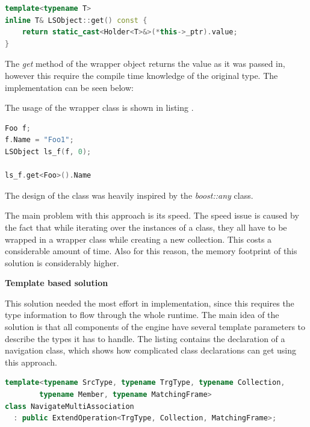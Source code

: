 \begin{lstlisting}[frame=single,float=!ht,language=C++, caption=Retrieving
correctly typed object]
template<typename T>
inline T& LSObject::get() const {
    return static_cast<Holder<T>&>(*this->_ptr).value;
}
\end{lstlisting}


The \emph{get} method of the wrapper object returns the value as it was passed
in, however this require the compile time knowledge of the original type. The
implementation can be seen below:

The usage of the wrapper class is shown in listing .

\begin{lstlisting}[frame=single,float=!ht,language=C++,
label=listing:wrapper_usage, caption=Wrapper object usage]
Foo f;
f.Name = "Foo1";
LSObject ls_f(f, 0);

ls_f.get<Foo>().Name
\end{lstlisting}

The design of the class was heavily inspired by the
\emph{boost::any}\cite{boost-any} class.

The main problem with this approach is its speed. The speed issue is caused by
the fact that while iterating over the instances of a class, they all have to be
wrapped in a wrapper class while creating a new collection. This costs a
considerable amount of time. Also for this reason, the memory footprint of this
solution is considerably higher.

\textbf{Template based solution}

This solution needed the most effort in implementation, since this requires
the type information to flow through the whole runtime. The main idea of the
solution is that all components of the engine have several template parameters
to describe the types it has to handle. The listing 
contains the declaration of a navigation class, which shows how complicated
class declarations can get using this approach.

\begin{lstlisting}[frame=single,float=!ht,language=C++,
label=listing:template_example, caption=Template based approach example]
template<typename SrcType, typename TrgType, typename Collection, 
		typename Member, typename MatchingFrame>
class NavigateMultiAssociation
  : public ExtendOperation<TrgType, Collection, MatchingFrame>;
\end{lstlisting}

